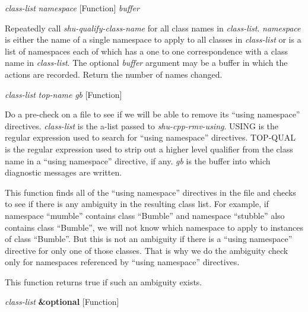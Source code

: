 \vspace{1em}
\noindent
{}
\usebox{\funcname}\emph{class-list} \emph{namespace}
 \hfill [Function]
\hspace*{\wd\funcname}\emph{buffer}

\begin{doc-string}
Repeatedly call \emph{shu-qualify-class-name} for all class names in \emph{class-list}.
\emph{namespace} is either the name of a single namespace to apply to all classes
in \emph{class-list} or is a list of namespaces each of which has a one to one
correspondence with a class name in \emph{class-list}.  The optional \emph{buffer}
argument may be a buffer in which the actions are recorded.  Return the
number of names changed.
\end{doc-string}

\vspace{1em}
\noindent
{}
\usebox{\funcname}\emph{class-list} \emph{top-name} \emph{gb}
 \hfill [Function]

\begin{doc-string}
Do a pre-check on a file to see if we will be able to remove its ``using
namespace'' directives.  \emph{class-list} is the a-list passed to \emph{shu-cpp-rmv-using}.
USING is the regular expression used to search for ``using namespace''
directives.  TOP-QUAL is the regular expression used to strip out a higher level
qualifier from the class name in a ``using namespace'' directive, if any.  \emph{gb} is
the buffer into which diagnostic messages are written.

This function finds all of the ``using namespace'' directives in the file and
checks to see if there is any ambiguity in the resulting class list.  For
example, if namespace ``mumble'' contains class ``Bumble'' and namespace
``stubble'' also contains class ``Bumble'', we will not know which namespace to
apply to instances of class ``Bumble''.  But this is not an ambiguity if there
is a ``using namespace'' directive for only one of those classes.  That is why
we do the ambiguity check only for namespaces referenced by ``using namespace''
directives.

This function returns true if such an ambiguity exists.
\end{doc-string}

\vspace{1em}
\noindent
{}
\usebox{\funcname}\emph{class-list} \textbf{\&optional}
 \hfill [Function]
\hspace*{\wd\funcname}


